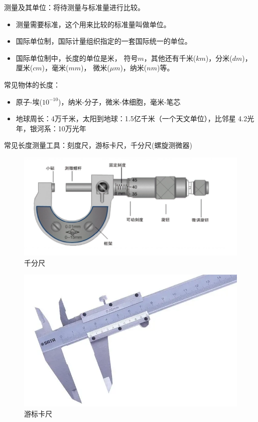 \documentclass[windows,csize4]{BHCexam}
\begin{document}
\begin{groups}
    测量及其单位：将待测量与标准量进行比较。
    \begin{itemize}
        \item 测量需要标准，这个用来比较的标准量叫做单位。
        \item 国际单位制，国际计量组织指定的一套国际统一的单位。
        \item 国际单位制中，长度的单位是米， 符号$m$，其他还有千米($km$)，分米($dm$)，厘米($cm$)，毫米($mm$)，
        微米($\mu m$)，纳米($nm$)等。
    \end{itemize}

    常见物体的长度：
    \begin{itemize}
        \item  原子-埃($10^{-10}$)，纳米-分子，微米-体细胞，毫米-笔芯
        \item 地球周长：4万千米，太阳到地球：1.5亿千米（一个天文单位），比邻星 4.2光年，银河系：10万光年
    \end{itemize}


    常见长度测量工具：刻度尺，游标卡尺，千分尺(螺旋测微器)
    \begin{figure}[htb]
        \centering
        \includegraphics [scale=0.25,trim=0 0 0 0]{./image/fig_1_3.PNG}
        \caption{千分尺} 
        \label{fig:fig_1_3}
    \end{figure}
    \begin{figure}[htb]
        \centering
        \includegraphics [scale=0.25,trim=0 0 0 0]{./image/fig_1_4.PNG}
        \caption{游标卡尺} 
        \label{fig:fig_1_4}
    \end{figure}


\end{groups}
\end{document}
